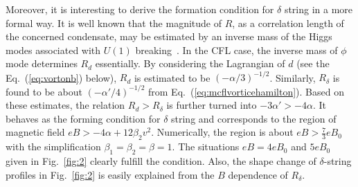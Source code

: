 \documentclass[12pt]{article}
\begin{document}
Moreover, it is interesting to derive the formation condition for $\delta$ string in a more formal way.
It is well known that the magnitude of $R$, as a correlation length of the concerned condensate, may be
estimated by an inverse mass of the Higgs modes associated with $U(1)$ breaking~\cite{vilenkin2000cosmic}.
In the CFL case, the inverse mass of $\phi$ mode determines $R_d$ essentially.
By considering the Lagrangian of $d$ (see the Eq.~(\ref{eq:vortonb}) below), $R_d$ is estimated to be
$(-\alpha/3)^{-1/2}$.
Similarly, $R_\delta$ is found to be about $(-\alpha'/4)^{-1/2}$ from Eq.~(\ref{eq:mcflvorticehamilton}).
Based on these estimates, the relation $R_d > R_\delta$ is further turned into
$- 3\alpha' > - 4\alpha$. It behaves as the forming condition for $\delta$ string and corresponds to the region of magnetic field 
$eB > - 4\alpha+12\beta_2 v^2$. Numerically, the region is about $eB > \frac{7}{3} eB_0$ with the simplification $\beta_1=\beta_2=\beta = 1$.
The situations $eB = 4eB_0 $ and $5eB_0$ given in Fig.~\ref{fig:2} clearly fulfill the condition.
Also, the shape change of $\delta$-string profiles in Fig.~\ref{fig:2} is easily explained 
from the $B$ dependence of $R_\delta$. 
\end{document}

